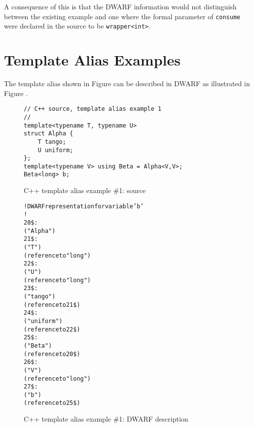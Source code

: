 A consequence of this is that the DWARF information would
not distinguish between the existing example and one where
the formal parameter of \texttt{consume} were declared in the source to be
\texttt{wrapper\textless int\textgreater}.


\section{Template Alias Examples}
\label{app:templatealiasexample}

The  template alias shown in
Figure 
can be described in DWARF as illustrated 
 in 
Figure .

\begin{figure}[ht]
\begin{lstlisting}
// C++ source, template alias example 1
//
template<typename T, typename U>
struct Alpha {
    T tango;
    U uniform;
};
template<typename V> using Beta = Alpha<V,V>;
Beta<long> b;
\end{lstlisting}
\caption{C++ template alias example \#1: source}
\label{fig:ctemplatealiasexample1source}
\end{figure}

\clearpage
\begin{figure}[ht]
\begin{dwflisting}
\begin{alltt}
! DWARF representation for variable 'b'
!
20\$:  \DWTAGstructuretype
          \DWATname("Alpha")
21\$:      \DWTAGtemplatetypeparameter
              \DWATname("T")
              \DWATtype(reference to "long")
22\$:      \DWTAGtemplatetypeparameter
              \DWATname("U")
              \DWATtype(reference to "long")
23\$:      \DWTAGmember
              \DWATname("tango")
              \DWATtype(reference to 21\$)
24\$:      \DWTAGmember
              \DWATname("uniform")
              \DWATtype(reference to 22\$)
25\$:  \DWTAGtemplatealias
          \DWATname("Beta")
          \DWATtype(reference to 20\$)
26\$:      \DWTAGtemplatetypeparameter
              \DWATname("V")
              \DWATtype(reference to "long")
27\$:  \DWTAGvariable
          \DWATname("b")
          \DWATtype(reference to 25\$)
\end{alltt}
\end{dwflisting}
\caption{C++ template alias example \#1: DWARF description}
\label{fig:ctemplatealiasexample1dwarf}
\end{figure}


